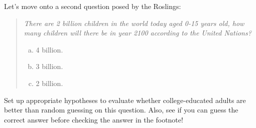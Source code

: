 \begin{exercisewrap}
\begin{nexercise}\label{roslingB_hypothesis_setup}%
Let's move onto a second question posed by the Roslings:
\begin{quote}{\em
  There are 2 billion children in the world today
  aged 0-15 years old, how many children will there
  be in year 2100 according to the United Nations?
  \begin{enumerate}[a.]
  \setlength{\itemsep}{0mm}
  \item 4 billion.
  \item 3 billion.
  \item 2 billion.
  \end{enumerate}
}\end{quote}
Set up appropriate hypotheses to evaluate whether
college-educated adults are better than random guessing
on this question.
Also, see if you can guess the correct answer before checking
the answer in the footnote!\footnotemark
\end{nexercise}
\end{exercisewrap}

\newcommand{\roslingBsize}{228}
\newcommand{\roslingBprop}{0.149}
\newcommand{\roslingBpropcomplement}{0.851}
\newcommand{\roslingBpercent}{14.9\%}
\newcommand{\roslingBpercentcomplement}{85.1\%}
\newcommand{\roslingBcount}{34}
\newcommand{\roslingBcountcomplement}{194}
\newcommand{\roslingBse}{0.024}

